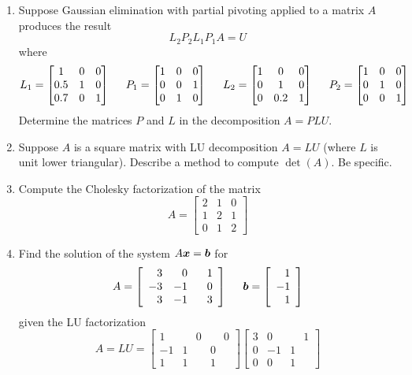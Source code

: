 \begin{enumerate}[leftmargin=*]
\item Suppose Gaussian elimination with partial pivoting applied to a matrix $A$ produces the result
$$
L_2 P_2 L_1 P_1 A = U
$$
where
$$
L_1 = \begin{bmatrix} 1 & 0 & 0 \\ 0.5 & 1 & 0 \\ 0.7 & 0 & 1 \end{bmatrix}
\hspace{5mm}
P_1 = \begin{bmatrix} 1 & 0 & 0 \\ 0 & 0 & 1 \\ 0 & 1 & 0 \end{bmatrix}
\hspace{5mm}
L_2 = \begin{bmatrix} 1 & 0 & 0 \\ 0 & 1 & 0 \\ 0 & 0.2 & 1 \end{bmatrix}
\hspace{5mm}
P_2 = \begin{bmatrix} 1 & 0 & 0 \\ 0 & 1 & 0 \\ 0 & 0 & 1 \end{bmatrix}
$$
Determine the matrices $P$ and $L$ in the decomposition $A = PLU$.

\item Suppose $A$ is a square matrix with LU decomposition $A = LU$ (where $L$ is unit lower triangular). Describe a method to compute $\det(A)$. Be specific.

\item Compute the Cholesky factorization of the matrix
$$
A = \begin{bmatrix} 2 & 1 & 0 \\ 1 & 2 & 1 \\ 0 & 1 & 2 \end{bmatrix}
$$

\item Find the solution of the system $A \boldsymbol{x} = \boldsymbol{b}$ for
$$
A = \left[ \begin{array}{rrr} 3 & 0 & \phantom{+}1 \\ -3 & -1 & 0 \\ 3 & -1 & 3 \end{array} \right]
\hspace{5mm}
\boldsymbol{b} = \left[ \begin{array}{r} 1 \\ -1 \\ 1 \end{array} \right]
$$
given the LU factorization
$$
A = LU
=
\left[ \begin{array}{rrr} 1 & \phantom{+}0 & \phantom{+}0 \\ -1 & 1 & 0 \\ 1 & 1 & 1 \end{array} \right]
\left[ \begin{array}{rrr} 3 & 0 & \phantom{+}1 \\ 0 & -1 & 1 \\ 0 & 0 & 1 \end{array} \right]
$$


\end{enumerate}
